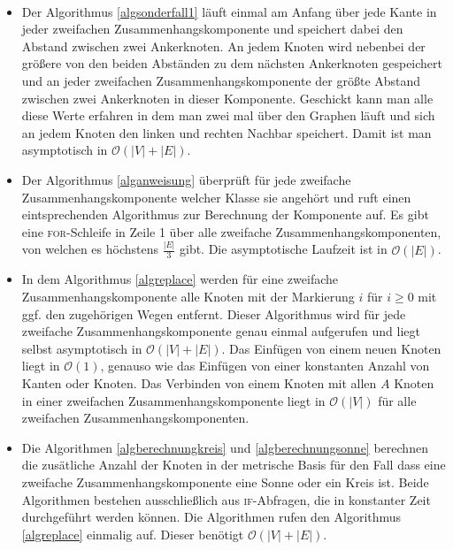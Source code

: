 \begin{bem}~
\begin{itemize}
\item Der Algorithmus \ref{algsonderfall1} läuft einmal am Anfang über jede Kante in jeder zweifachen Zusammenhangskomponente und speichert dabei den Abstand zwischen zwei Ankerknoten. An jedem Knoten wird nebenbei der größere von den beiden Abständen zu dem nächsten Ankerknoten gespeichert und an jeder zweifachen Zusammenhangskomponente der größte Abstand zwischen zwei Ankerknoten in dieser Komponente. Geschickt kann man alle diese Werte erfahren in dem man zwei mal über den Graphen läuft und sich an jedem Knoten den linken und rechten Nachbar speichert. Damit ist man asymptotisch in $\mathcal{O}(|V|+|E|)$.

\item Der Algorithmus \ref{alganweisung} überprüft für jede zweifache Zusammenhangskomponente welcher Klasse sie angehört und ruft einen eintsprechenden Algorithmus zur Berechnung der Komponente auf. Es gibt eine \textsc{for}-Schleife in Zeile 1 über alle zweifache Zusammenhangskomponenten, von welchen es höchstens $\frac{|E|}{3}$ gibt. Die asymptotische Laufzeit ist in $\mathcal{O}(|E|)$.

\item In dem Algorithmus \ref{algreplace} werden für eine zweifache Zusammenhangskomponente alle Knoten mit der Markierung $i$ für $i \geq 0$ mit ggf. den zugehörigen Wegen entfernt. Dieser Algorithmus wird für jede zweifache Zusammenhangskomponente genau einmal aufgerufen und liegt selbst asymptotisch in $\mathcal{O}(|V|+|E|)$.
Das Einfügen von einem neuen Knoten liegt in $\mathcal{O}(1)$, genauso wie das Einfügen von einer konstanten Anzahl von Kanten oder Knoten. Das Verbinden von einem Knoten mit allen $A$ Knoten in einer zweifachen Zusammenhangskomponente liegt in $\mathcal{O}(|V|)$ für alle zweifachen Zusammenhangskomponenten.

\item Die Algorithmen \ref{algberechnungkreis} und \ref{algberechnungsonne} berechnen die zusätliche Anzahl der Knoten in der metrische Basis für den Fall dass eine zweifache Zusammenhangskomponente eine Sonne oder ein Kreis ist. Beide Algorithmen bestehen ausschließlich aus \textsc{if}-Abfragen, die in konstanter Zeit durchgeführt werden können. Die Algorithmen rufen den Algorithmus \ref{algreplace} einmalig auf. Dieser benötigt $\mathcal{O}(|V|+|E|)$.


\end{itemize}
\end{bem}
